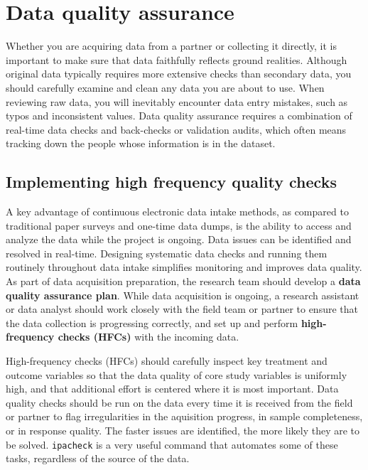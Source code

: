 \section{Data quality assurance}

Whether you are acquiring data from a partner or collecting it directly,
it is important to make sure that data faithfully reflects ground realities.
Although original data typically requires more extensive checks than secondary data,
you should carefully examine and clean any data you are about to use.
When reviewing raw data, you will inevitably encounter data entry mistakes,
such as typos and inconsistent values.
Data quality assurance requires a combination of real-time data checks
and back-checks or validation audits, which often means tracking down
the people whose information is in the dataset.

\subsection{Implementing high frequency quality checks}

A key advantage of continuous electronic data intake methods,
as compared to traditional paper surveys and one-time data dumps,
is the ability to access and analyze the data while the project is ongoing.
Data issues can be identified and resolved in real-time.
Designing systematic data checks and running them routinely throughout data intake
simplifies monitoring and improves data quality.
As part of data acquisition preparation,
the research team should develop a \textbf{data quality assurance plan}.
While data acquisition is ongoing,
a research assistant or data analyst should work closely with the field team or partner
to ensure that the data collection is progressing correctly,
and set up and perform \textbf{high-frequency checks (HFCs)} with the incoming data.

High-frequency checks (HFCs) should carefully inspect key treatment and outcome variables
so that the data quality of core study variables is uniformly high,
and that additional effort is centered where it is most important.
Data quality checks should be run on the data every time it is received from the field or partner
to flag irregularities in the aquisition progress, in sample completeness, or in response quality.
The faster issues are identified, the more likely they are to be solved.
\texttt{ipacheck}
is a very useful command that automates some of these tasks,
regardless of the source of the data.

